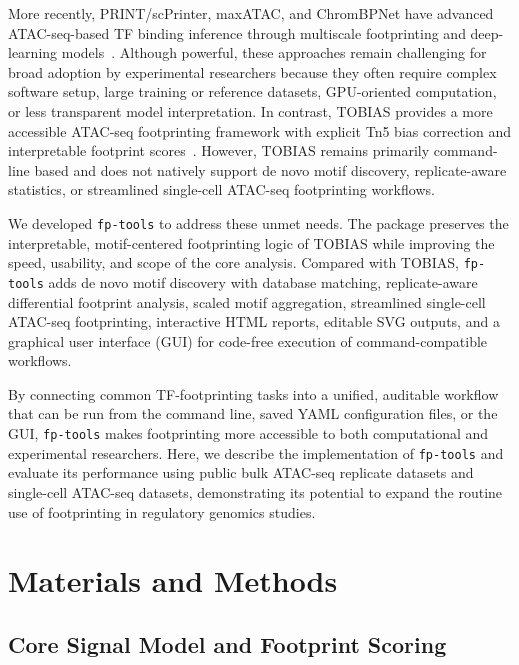 \documentclass[biomedinformatics,article,submit,pdftex,moreauthors]{Definitions/mdpi}
\begin{document}
More recently, PRINT/scPrinter, maxATAC, and ChromBPNet have advanced
ATAC-seq-based TF binding inference through multiscale footprinting and
deep-learning models~\cite{hu2024print,cazares2023maxatac,chrombpnet2024}.
Although powerful, these approaches remain challenging for broad adoption by
experimental researchers because they often require complex software setup,
large training or reference datasets, GPU-oriented computation, or less
transparent model interpretation. In contrast, TOBIAS provides a more accessible
ATAC-seq footprinting framework with explicit Tn5 bias correction and
interpretable footprint scores~\cite{bentsen2020}. However, TOBIAS remains
primarily command-line based and does not natively support de novo motif
discovery, replicate-aware statistics, or streamlined single-cell ATAC-seq
footprinting workflows.

We developed \texttt{fp-tools} to address these unmet needs. The package
preserves the interpretable, motif-centered footprinting logic of TOBIAS while
improving the speed, usability, and scope of the core analysis. Compared with
TOBIAS, \texttt{fp-tools} adds de novo motif discovery with database matching,
replicate-aware differential footprint analysis, scaled motif aggregation,
streamlined single-cell ATAC-seq footprinting, interactive HTML reports, editable
SVG outputs, and a graphical user interface (GUI) for code-free execution of
command-compatible workflows.

By connecting common TF-footprinting tasks into a unified, auditable workflow
that can be run from the command line, saved YAML configuration files, or the
GUI, \texttt{fp-tools} makes footprinting more accessible to both computational
and experimental researchers. Here, we describe the implementation of
\texttt{fp-tools} and evaluate its performance using public bulk ATAC-seq
replicate datasets and single-cell ATAC-seq datasets, demonstrating its potential
to expand the routine use of footprinting in regulatory genomics studies.


\section{Materials and Methods}

\subsection{Core Signal Model and Footprint Scoring}
\end{document}
